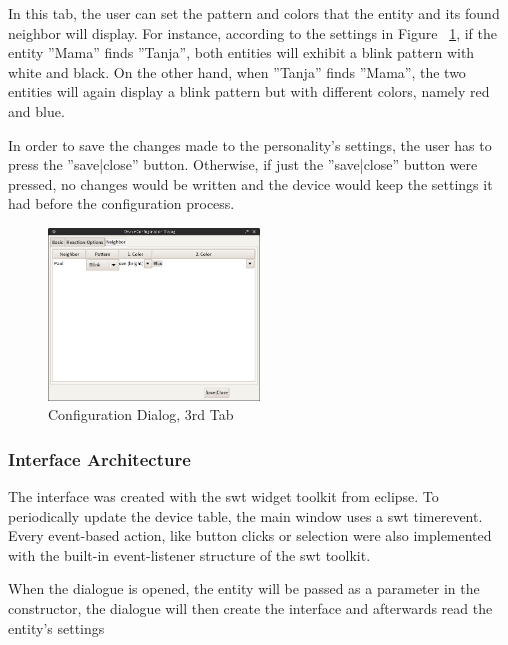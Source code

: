 In this tab, the user can set the pattern and colors that the entity and its found neighbor will display. For instance, according to the settings in Figure ~\ref{fig:java-server-config03}, if the entity ''Mama'' finds ''Tanja'', both entities will exhibit a blink pattern with white and black. On the other hand, when ''Tanja'' finds ''Mama'', the two entities will again display a blink pattern but with different colors, namely red and blue. 

In order to save the changes made to the personality's settings, the user has to press the ''save|close'' button. Otherwise, if just the ''save|close'' button were pressed, no changes would be written and the device would keep the settings it had before the configuration process.

\begin{figure}[h!]
 \centering
 \includegraphics[width= 0.5\textwidth, clip=true  ,keepaspectratio=true]{./pic/java-server-config03.png}
 \caption{Configuration Dialog, 3rd Tab}
 \label{fig:java-server-config03}
\end{figure}

\subsubsection{Interface Architecture}
The interface was created with the swt widget toolkit from eclipse. %
To periodically update the device table, the main window uses a swt timerevent. Every event-based action, like button clicks or selection were also implemented with the built-in event-listener structure of the swt toolkit. %

When the dialogue is opened, the entity will be passed as a parameter in the constructor, the dialogue will then create the interface and afterwards read the entity's settings %

